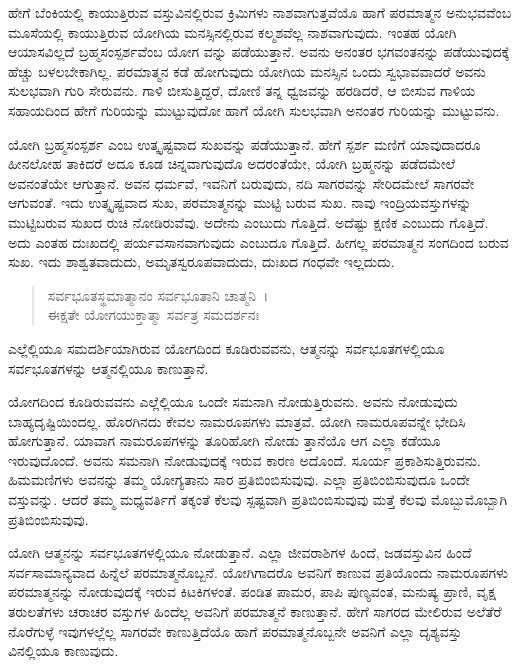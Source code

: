 ಹೇಗೆ ಬೆಂಕಿಯಲ್ಲಿ ಕಾಯುತ್ತಿರುವ ವಸ್ತುವಿನಲ್ಲಿರುವ ಕ್ರಿಮಿಗಳು ನಾಶವಾಗುತ್ತವೆಯೊ ಹಾಗೆ ಪರಮಾತ್ಮನ ಅನುಭವವೆಂಬ ಮೂಸೆಯಲ್ಲಿ ಕಾಯುತ್ತಿರುವ ಯೋಗಿಯ ಮನಸ್ಸಿನಲ್ಲಿರುವ ಕಲ್ಮಶವೆಲ್ಲ ನಾಶವಾಗುವುದು. ಇಂತಹ ಯೋಗಿ ಆಯಾಸವಿಲ್ಲದೆ ಬ್ರಹ್ಮಸಂಸ್ಪರ್ಶವೆಂಬ ಯೋಗ ವನ್ನು ಪಡೆಯುತ್ತಾನೆ. ಅವನು ಅನಂತರ ಭಗವಂತನನ್ನು ಪಡೆಯುವುದಕ್ಕೆ ಹೆಚ್ಚು ಬಳಲಬೇಕಾಗಿಲ್ಲ. ಪರಮಾತ್ಮನ ಕಡೆ ಹೋಗುವುದು ಯೋಗಿಯ ಮನಸ್ಸಿನ ಒಂದು ಸ್ವಭಾವವಾದರೆ ಅವನು ಸುಲಭವಾಗಿ ಗುರಿ ಸೇರುವನು. ಗಾಳಿ ಬೀಸುತ್ತಿದ್ದರೆ, ದೋಣಿ ತನ್ನ ಧ್ವಜವನ್ನು ಹರಡಿದರೆ, ಆ ಬೀಸುವ ಗಾಳಿಯ ಸಹಾಯದಿಂದ ಹೇಗೆ ಗುರಿಯನ್ನು ಮುಟ್ಟುವುದೋ ಹಾಗೆ ಯೋಗಿ ಸುಲಭವಾಗಿ ಅನಂತರ ಗುರಿಯನ್ನು ಮುಟ್ಟುವನು.

ಯೋಗಿ ಬ್ರಹ್ಮಸಂಸ್ಪರ್ಶ ಎಂಬ ಉತ್ಕೃಷ್ಟವಾದ ಸುಖವನ್ನು ಪಡೆಯುತ್ತಾನೆ. ಹೇಗೆ ಸ್ಪರ್ಶ ಮಣಿಗೆ ಯಾವುದಾದರೂ ಹೀನಲೋಹ ತಾಕಿದರೆ ಅದೂ ಕೂಡ ಚಿನ್ನವಾಗುವುದೊ ಅದರಂತೆಯೇ, ಯೋಗಿ ಬ್ರಹ್ಮನನ್ನು ಪಡೆದಮೇಲೆ ಅವನಂತೆಯೇ ಆಗುತ್ತಾನೆ. ಅವನ ಧರ್ಮವೆ, ಇವನಿಗೆ ಬರುವುದು, ನದಿ ಸಾಗರವನ್ನು ಸೇರಿದಮೇಲೆ ಸಾಗರವೇ ಆಗುವಂತೆ. ಇದು ಉತ್ಕೃಷ್ಟವಾದ ಸುಖ, ಪರಮಾತ್ಮನನ್ನು ಮುಟ್ಟಿ ಬರುವ ಸುಖ. ನಾವು ಇಂದ್ರಿಯವಸ್ತುಗಳನ್ನು ಮುಟ್ಟಿಬರುವ ಸುಖದ ರುಚಿ ನೋಡಿರುವೆವು. ಅದೇನು ಎಂಬುದು ಗೊತ್ತಿದೆ. ಅದೆಷ್ಟು ಕ್ಷಣಿಕ ಎಂಬುದು ಗೊತ್ತಿದೆ. ಅದು ಎಂತಹ ದುಃಖದಲ್ಲಿ ಪರ್ಯವಸಾನವಾಗುವುದು ಎಂಬುದೂ ಗೊತ್ತಿದೆ. ಹೀಗಲ್ಲ ಪರಮಾತ್ಮನ ಸಂಗದಿಂದ ಬರುವ ಸುಖ. ಇದು ಶಾಶ್ವತವಾದುದು, ಅಮೃತಸ್ವರೂಪವಾದುದು, ದುಃಖದ ಗಂಧವೇ ಇಲ್ಲದುದು.

\begin{verse}
ಸರ್ವಭೂತಸ್ಥಮಾತ್ಮಾನಂ ಸರ್ವಭೂತಾನಿ ಚಾತ್ಮನಿ~।\\ಈಕ್ಷತೇ ಯೋಗಯುಕ್ತಾತ್ಮಾ ಸರ್ವತ್ರ ಸಮದರ್ಶನಃ 
\end{verse}

{\small ಎಲ್ಲೆಲ್ಲಿಯೂ ಸಮದರ್ಶಿಯಾಗಿರುವ ಯೋಗದಿಂದ ಕೂಡಿರುವವನು, ಆತ್ಮನನ್ನು ಸರ್ವಭೂತಗಳಲ್ಲಿಯೂ ಸರ್ವಭೂತಗಳನ್ನು ಆತ್ಮನಲ್ಲಿಯೂ ಕಾಣುತ್ತಾನೆ.}

ಯೋಗದಿಂದ ಕೂಡಿರುವವನು ಎಲ್ಲೆಲ್ಲಿಯೂ ಒಂದೇ ಸಮನಾಗಿ ನೋಡುತ್ತಿರುವನು. ಅವನು ನೋಡುವುದು ಬಾಹ್ಯದೃಷ್ಟಿಯಿಂದಲ್ಲ. ಹೊರಗಿನದು ಕೇವಲ ನಾಮರೂಪಗಳು ಮಾತ್ರವೆ. ಯೋಗಿ ನಾಮರೂಪವನ್ನೇ ಭೇದಿಸಿ ಹೋಗುತ್ತಾನೆ. ಯಾವಾಗ ನಾಮರೂಪಗಳನ್ನು ತೂರಿಹೋಗಿ ನೋಡು ತ್ತಾನೆಯೊ ಆಗ ಎಲ್ಲಾ ಕಡೆಯೂ ಇರುವುದೊಂದೆ. ಅವನು ಸಮನಾಗಿ ನೋಡುವುದಕ್ಕೆ ಇರುವ ಕಾರಣ ಅದೊಂದೆ. ಸೂರ್ಯ ಪ್ರಕಾಶಿಸುತ್ತಿರುವನು. ಹಿಮಮಣಿಗಳು ಅವನನ್ನು ತಮ್ಮ ಯೋಗ್ಯತಾನು ಸಾರ ಪ್ರತಿಬಿಂಬಿಸುವುವು. ಎಲ್ಲಾ ಪ್ರತಿಬಿಂಬಿಸುವುದೂ ಒಂದೇ ವಸ್ತುವನ್ನು. ಆದರೆ ತಮ್ಮ ಮಧ್ಯವರ್ತಿಗೆ ತಕ್ಕಂತೆ ಕೆಲವು ಸ್ಪಷ್ಟವಾಗಿ ಪ್ರತಿಬಿಂಬಿಸುವುವು ಮತ್ತೆ ಕೆಲವು ಮೊಬ್ಬುಮೊಬ್ಬಾಗಿ ಪ್ರತಿಬಿಂಬಿಸುವುವು.

ಯೋಗಿ ಆತ್ಮನನ್ನು ಸರ್ವಭೂತಗಳಲ್ಲಿಯೂ ನೋಡುತ್ತಾನೆ. ಎಲ್ಲಾ ಜೀವರಾಶಿಗಳ ಹಿಂದೆ, ಜಡವಸ್ತುವಿನ ಹಿಂದೆ ಸರ್ವಸಾಮಾನ್ಯವಾದ ಹಿನ್ನೆಲೆ ಪರಮಾತ್ಮನೊಬ್ಬನೆ. ಯೋಗಿಗಾದರೊ ಅವನಿಗೆ ಕಾಣುವ ಪ್ರತಿಯೊಂದು ನಾಮರೂಪಗಳು ಪರಮಾತ್ಮನನ್ನು ನೋಡುವುದಕ್ಕೆ ಇರುವ ಕಿಟಕಿಗಳಂತೆ. ಪಂಡಿತ ಪಾಮರ, ಪಾಪಿ ಪುಣ್ಯವಂತ, ಮನುಷ್ಯ ಪ್ರಾಣಿ, ವೃಕ್ಷ ತರುಲತೆಗಳು ಚರಾಚರ ವಸ್ತುಗಳ ಹಿಂದೆಲ್ಲ ಅವನಿಗೆ ಪರಮಾತ್ಮನೆ ಕಾಣುತ್ತಾನೆ. ಹೇಗೆ ಸಾಗರದ ಮೇಲಿರುವ ಅಲೆತೆರೆ ನೊರೆಗುಳ್ಳೆ ಇವುಗಳಲ್ಲೆಲ್ಲ ಸಾಗರವೇ ಕಾಣುತ್ತಿದೆಯೊ ಹಾಗೆ ಪರಮಾತ್ಮನೊಬ್ಬನೇ ಅವನಿಗೆ ಎಲ್ಲಾ ದೃಶ್ಯವಸ್ತು ವಿನಲ್ಲಿಯೂ ಕಾಣುವುದು.

